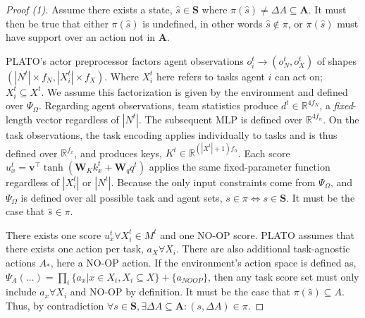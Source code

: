 

\begin{proof}[Proof (1)]
    \label{proof:definedpi}
    Assume there exists a state, $\hat{s} \in \mathbf{S}$ where $\pi(\hat{s})\neq \Delta A \subseteq \mathbf{A}$. It must then be true that either $\pi(\hat{s})$
 is undefined, in other words $\hat{s} \notin \pi$, or $\pi(\hat{s})$ must have support over an action not in $\mathbf{A}$.
 
    PLATO's actor preprocessor factors agent observations $o_i^t \to (o_N^t, o_X^t)$ of shapes $(|N^t| \times f_N,|X_i^t|\times f_X)$.  Where $X^t_i$ here refers to tasks agent $i$ can act on; $X_i^t\subseteq X^t$. We assume this factorization is given by the environment and defined over $\Psi_\Omega$. Regarding agent observations, team statistics produce $d^t \in \mathbb{R}^{4f_N}$, a \emph{fixed}-length vector regardless of $|N^t|$. The subsequent MLP is defined over $\mathbb{R}^{4f_n}$. On the task observations, the task encoding applies individually to tasks and is thus defined over $\mathbb{R}^{f_x}$, and produces keys, $K^t \in \mathbb{R}^{(|X^t|+1)f_h}$. Each score $u_x^t = \mathbf{v}^\top\!\tanh(\mathbf{W}_K k_x^t + \mathbf{W}_q q^t)$ applies the same fixed-parameter function regardless of $|X^t_i|$ or $|N^t|$. Because the only input constraints come from $\Psi_\Omega$, and $\Psi_\Omega$  is defined over all possible task and agent sets, $s\in \pi \iff s \in \mathbf{S}$. It must be the case that $\hat{s} \in \pi$.

There exists one score $u_x^t \forall X_i^t \in M^t$ and one NO-OP score. PLATO assumes that there exists one action per task, $a_X \forall X_i$. There are also additional task-agnostic actions $A_*$, here a NO-OP action.  If the environment's action space is defined as, $\Psi_A(...) = \prod_{i}\{a_x  | x \in X_i, X_i\subseteq X\} + \{a_{NOOP}\}$, then any task score set must only include $a_x \forall X_i$ and NO-OP by definition. It must be the case that $\pi(\hat{s})\subseteq A$. Thus, by contradiction  $\forall s \in \mathbf{S}, \exists\Delta A \subseteq \mathbf{A}: (s,\Delta A) \in \pi$. 
\end{proof}


